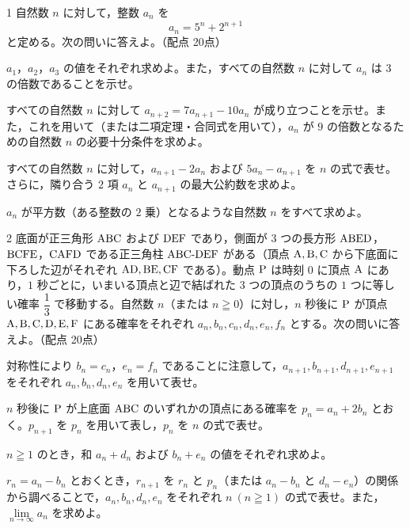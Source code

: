 \begin{monsheet}

\begin{daimon}{1}
自然数 $n$ に対して，整数 $a_{n}$ を
\[
  a_{n} = 5^{n} + 2^{n+1}
\]
と定める。次の問いに答えよ。\hfill（配点 20点）
\begin{shomon}
  \item $a_{1}$，$a_{2}$，$a_{3}$ の値をそれぞれ求めよ。また，すべての自然数 $n$ に対して $a_{n}$ は $3$ の倍数であることを示せ。
  \item すべての自然数 $n$ に対して $a_{n+2}=7a_{n+1}-10a_{n}$ が成り立つことを示せ。また，これを用いて（または二項定理・合同式を用いて），$a_{n}$ が $9$ の倍数となるための自然数 $n$ の必要十分条件を求めよ。
  \item すべての自然数 $n$ に対して，$a_{n+1}-2a_{n}$ および $5a_{n}-a_{n+1}$ を $n$ の式で表せ。さらに，隣り合う $2$ 項 $a_{n}$ と $a_{n+1}$ の最大公約数を求めよ。
  \item $a_{n}$ が平方数（ある整数の $2$ 乗）となるような自然数 $n$ をすべて求めよ。
\end{shomon}
\end{daimon}

\begin{daimon}{2}
底面が正三角形 $\mathrm{ABC}$ および $\mathrm{DEF}$ であり，側面が $3$ つの長方形 $\mathrm{ABED}$，$\mathrm{BCFE}$，$\mathrm{CAFD}$ である正三角柱 $\mathrm{ABC\text{-}DEF}$ がある（頂点 $\mathrm{A}, \mathrm{B}, \mathrm{C}$ から下底面に下ろした辺がそれぞれ $\mathrm{AD}, \mathrm{BE}, \mathrm{CF}$ である）。動点 $\mathrm{P}$ は時刻 $0$ に頂点 $\mathrm{A}$ にあり，$1$ 秒ごとに，いまいる頂点と辺で結ばれた $3$ つの頂点のうちの $1$ つに等しい確率 $\dfrac{1}{3}$ で移動する。自然数 $n$（または $n\geqq 0$）に対し，$n$ 秒後に $\mathrm{P}$ が頂点 $\mathrm{A}, \mathrm{B}, \mathrm{C}, \mathrm{D}, \mathrm{E}, \mathrm{F}$ にある確率をそれぞれ $a_{n}, b_{n}, c_{n}, d_{n}, e_{n}, f_{n}$ とする。次の問いに答えよ。\hfill（配点 20点）
\begin{shomon}
  \item 対称性により $b_{n}=c_{n}$，$e_{n}=f_{n}$ であることに注意して，$a_{n+1}, b_{n+1}, d_{n+1}, e_{n+1}$ をそれぞれ $a_{n}, b_{n}, d_{n}, e_{n}$ を用いて表せ。
  \item $n$ 秒後に $\mathrm{P}$ が上底面 $\mathrm{ABC}$ のいずれかの頂点にある確率を $p_{n}=a_{n}+2b_{n}$ とおく。$p_{n+1}$ を $p_{n}$ を用いて表し，$p_{n}$ を $n$ の式で表せ。
  \item $n\geqq 1$ のとき，和 $a_{n}+d_{n}$ および $b_{n}+e_{n}$ の値をそれぞれ求めよ。
  \item $r_{n}=a_{n}-b_{n}$ とおくとき，$r_{n+1}$ を $r_{n}$ と $p_{n}$（または $a_{n}-b_{n}$ と $d_{n}-e_{n}$）の関係から調べることで，$a_{n}, b_{n}, d_{n}, e_{n}$ をそれぞれ $n\ (n\geqq 1)$ の式で表せ。また，$\lim\limits_{n\to\infty}a_{n}$ を求めよ。
\end{shomon}
\end{daimon}


\end{monsheet}
